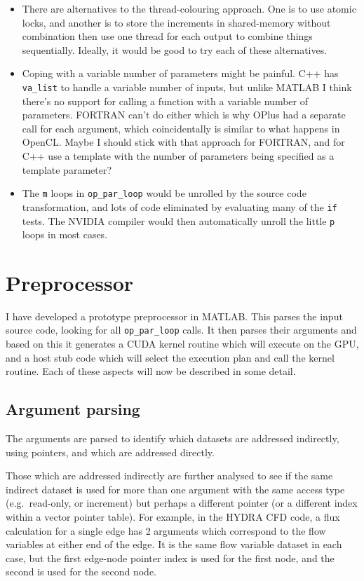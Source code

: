 \documentclass[12pt]{article}
\begin{document}
\begin{itemize}
\item
There are alternatives to the thread-colouring approach.  One is to use 
atomic locks, and another is to store the increments in shared-memory 
without combination then use one thread for each output to combine things
sequentially.  Ideally, it would be good to try each of these alternatives.

\item
Coping with a variable number of parameters might be painful.  C++ has 
{\tt va\_list} to handle a variable number of inputs, but unlike MATLAB 
I think there's no support for calling a function with a variable number 
of parameters.  FORTRAN can't do either which is why OPlus had a separate 
call for each argument, which coincidentally is similar to what happens in 
OpenCL.  Maybe I should stick with that approach for FORTRAN, and for C++ 
use a template with the number of parameters being specified as a template 
parameter?

\item
The {\tt m} loops in {\tt op\_par\_loop} would be unrolled by the source code 
transformation, and lots of code eliminated by evaluating many of the {\tt if} 
tests.  The NVIDIA compiler would then automatically unroll the little 
{\tt p} loops in most cases.

\end{itemize}


\newpage

\section{Preprocessor}

I have developed a prototype preprocessor in MATLAB.  This parses 
the input source code, looking for all {\tt op\_par\_loop} calls.
It then parses their arguments and based on this it generates a CUDA
kernel routine which will execute on the GPU, and a host stub code 
which will select the execution plan and call the kernel routine.
Each of these aspects will now be described in some detail.

\subsection{Argument parsing}

The arguments are parsed to identify which datasets are addressed 
indirectly, using pointers, and which are addressed directly.

Those which are addressed indirectly are further analysed to see
if the same indirect dataset is used for more than one argument
with the same access type (e.g.~read-only, or increment) but
perhaps a different pointer (or a different index within a 
vector pointer table).  For example, in the HYDRA CFD code, 
a flux calculation for a single edge has 2 arguments which 
correspond to the flow variables at either end of the edge. 
It is the same flow variable dataset in each case, but the 
first edge-node pointer index is used for the first node, and 
the second is used for the second node.
\end{document}
